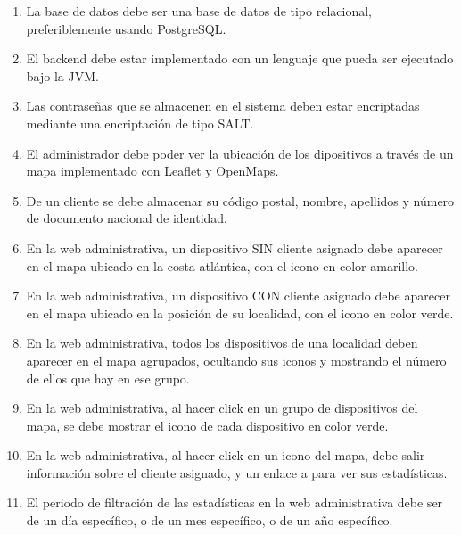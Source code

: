 \begin{enumerate}

    \item La base de datos debe ser una base de datos de tipo relacional, preferiblemente usando PostgreSQL.
    
    \item El backend debe estar implementado con un lenguaje que pueda ser ejecutado bajo la JVM.
    
    \item Las contraseñas que se almacenen en el sistema deben estar encriptadas mediante una encriptación de tipo SALT.
    
    \item El administrador debe poder ver la ubicación de los dipositivos a través de un mapa implementado con Leaflet y OpenMaps.
    
    \item De un cliente se debe almacenar su código postal, nombre, apellidos y número de documento nacional de identidad.
    
    \item En la web administrativa, un dispositivo SIN cliente asignado debe aparecer en el mapa ubicado en la costa atlántica, con el icono en color amarillo.
    
    \item En la web administrativa, un dispositivo CON cliente asignado debe aparecer en el mapa ubicado en la posición de su localidad, con el icono en color verde.
    
    \item En la web administrativa, todos los dispositivos de una localidad deben aparecer en el mapa agrupados, ocultando sus iconos y mostrando el número de ellos que hay en ese grupo.
    
    \item En la web administrativa, al hacer click en un grupo de dispositivos del mapa, se debe mostrar el icono de cada dispositivo en color verde.
    
    \item En la web administrativa, al hacer click en un icono del mapa, debe salir información sobre el cliente asignado, y un enlace a para ver sus estadísticas.
    
    \item El periodo de filtración de las estadísticas en la web administrativa debe ser de un día específico, o de un mes específico, o de un año específico.
    

\end{enumerate}
